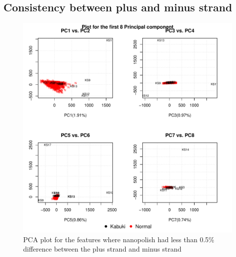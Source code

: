 \subsection{Consistency between plus and minus strand}

\begin{figure}[!h]
    \centering
    \includegraphics[width=\textwidth]{figures/PCA/plus_minus/pca_plot_label.pdf}
    \caption{PCA plot for the features where nanopolish had less than 0.5\% difference between the plus strand and minus strand}
    \label{fig:certain-PCA}
\end{figure}

